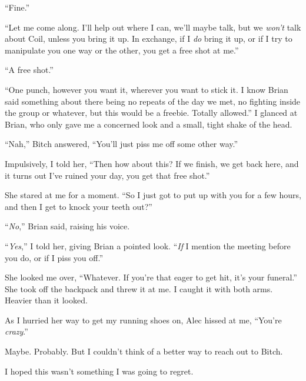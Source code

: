 ``Fine.''



``Let me come along.  I'll help out where I can, we'll maybe talk, but we \emph{won't} talk about Coil, unless you bring it up.  In exchange, if I \emph{do} bring it up, or if I try to manipulate you one way or the other, you get a free shot at me.''



``A free shot.''



``One punch, however you want it, wherever you want to stick it.  I know Brian said something about there being no repeats of the day we met, no fighting inside the group or whatever, but this would be a freebie.  Totally allowed.''  I glanced at Brian, who only gave me a concerned look and a small, tight shake of the head.



``Nah,'' Bitch answered, ``You'll just piss me off some other way.''



Impulsively, I told her, ``Then how about this?  If we finish, we get back here, and it turns out I've ruined your day, you get that free shot.''



She stared at me for a moment.  ``So I just got to put up with you for a few hours, and then I get to knock your teeth out?''



``\emph{No},'' Brian said, raising his voice.



``\emph{Yes},'' I told her, giving Brian a pointed look.  ``\emph{If }I mention the meeting before you do, or if I piss you off.''



She looked me over, ``Whatever.  If you're that eager to get hit, it's your funeral.''  She took off the backpack and threw it at me.  I caught it with both arms.  Heavier than it looked.



As I hurried her way to get my running shoes on, Alec hissed at me, ``You're \emph{crazy}.''



Maybe.  Probably.  But I couldn't think of a better way to reach out to Bitch.



I hoped this wasn't something I was going to regret.













